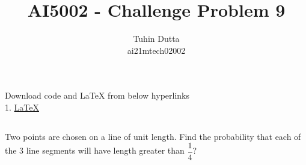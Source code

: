 \documentclass[journal,12pt,twocolumn]{IEEEtran}
\begin{document}
\providecommand{\mtx}[1]{\mathbf{#1}}
\providecommand{\fourier}{\overset{\mathcal{F}}{ \rightleftharpoons}}
\providecommand{\system}{\overset{\mathcal{H}}{ \longleftrightarrow}}
\newcommand{\solution}{\noindent \textbf{Solution: }}
\newcommand{\cosec}{\,\text{cosec}\,}
\providecommand{\dec}[2]{\ensuremath{\overset{#1}{\underset{#2}{\gtrless}}}}
\newcommand{\myvec}[1]{\ensuremath{\begin{pmatrix}#1\end{pmatrix}}}
\newcommand{\mydet}[1]{\ensuremath{\begin{vmatrix}#1\end{vmatrix}}}
\makeatletter
{}
\makeatother
\let\StandardTheFigure\thefigure
\let\vec\mathbf
\renewcommand{\thefigure}{\theproblem}
\def\putbox#1#2#3{\makebox[0in][l]{\makebox[#1][l]{}\raisebox{\baselineskip}[0in][0in]{\raisebox{#2}[0in][0in]{#3}}}}
     \def\rightbox#1{\makebox[0in][r]{#1}}
     \def\centbox#1{\makebox[0in]{#1}}
     \def\topbox#1{\raisebox{-\baselineskip}[0in][0in]{#1}}
     \def\midbox#1{\raisebox{-0.5\baselineskip}[0in][0in]{#1}}
\vspace{3cm}
\title{AI5002 - Challenge Problem 9}
\author{Tuhin Dutta\\ ai21mtech02002}
\maketitle
\newpage
\bigskip
\renewcommand{\thefigure}{\theenumi}
\renewcommand{\thetable}{\theenumi}
\begin{mdframed}
Download code and LaTeX from below hyperlinks\\
1. \href{https://github.com/Tauhait/AI5002/tree/main/Challenge-Problem/9/LaTeX}{LaTeX}
\end{mdframed}
\subsection*{}
Two points are chosen on a line of unit length. Find the probability that each of the 3 line segments will have length greater than $\dfrac{1}{4}$?
\end{document}
